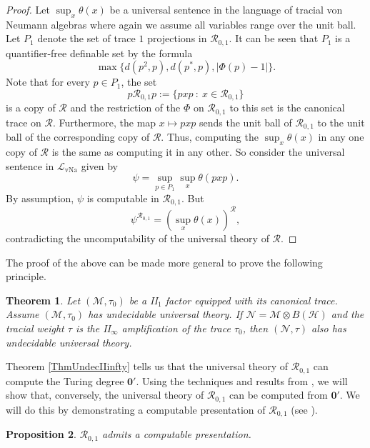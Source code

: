 \documentclass[12pt]{amsart}
\newtheorem{thm}{Theorem}[section]
\newtheorem{prop}[thm]{Proposition}
\theoremstyle{definition}
\def\cal{\mathcal}
\DeclareMathOperator{\vNa}{vNa}
\newcommand\R{{\cal R}}
\begin{document}
\begin{proof}
    Let $\sup_{x}\theta(x)$ be a universal sentence in the language of tracial von Neumann algebras where again we assume all variables range over the unit ball.  Let $P_1$ denote the set of trace $1$ projections in $\R_{0,1}$.  It can be seen that $P_1$ is a quantifier-free definable set by the formula
    \[
    \max \{d(p^2,p), d(p^*,p), |\Phi(p) - 1|\}.
    \]
    Note that for every $p \in P_1$, the set
    \[
    p\R_{0,1}p := \{pxp \ : \ x \in \R_{0,1} \}
    \]
    is a copy of $\R$ and the restriction of the $\Phi$ on $\R_{0,1}$ to this set is the canonical trace on $\R$.  Furthermore, the map $x \mapsto pxp$ sends the unit ball of $\R_{0,1}$ to the unit ball of the corresponding copy of $\R$.  Thus, computing the $\sup_{x} \theta(x)$ in any one copy of $\R$ is the same as computing it in any other.  So consider the universal sentence in $\cal L_{\vNa}$ given by
    \[
    \psi = \sup_{p \in P_1} \sup_{x} \theta(pxp).
    \]
    By assumption, $\psi$ is computable in $\R_{0,1}$.  But
    \[
    \psi^{\R_{0,1}} = (\sup_{x} \theta(x))^{\R},
    \]
    contradicting the uncomputability of the universal theory of $\R$.
\end{proof}

The proof of the above can be made more general to prove the following principle.

\begin{thm}
    Let $(\cal M, \tau_0)$ be a II$_1$ factor equipped with its canonical trace.  Assume $(\cal M, \tau_0)$ has undecidable universal theory.  If $\cal N = \cal M \otimes B(\cal H)$ and the tracial weight $\tau$ is the II$_\infty$ amplification of the trace $\tau_0$, then $(\cal N, \tau)$ also has undecidable universal theory.
\end{thm}

Theorem \ref{ThmUndecIIinfty} tells us that the universal theory of $\R_{0,1}$ can compute the Turing degree $\mathbf{0}'$.  Using the techniques and results from \cite{GHHyp}, we will show that, conversely, the universal theory of $\R_{0,1}$ can be computed from $\mathbf{0}'$. We will do this by demonstrating a computable presentation of $\R_{0,1}$ (see \cite[Remark 3.12]{GHHyp}).

\begin{prop}\label{PropCompPres}
    $\R_{0,1}$ admits a computable presentation.
\end{prop}
\end{document}
